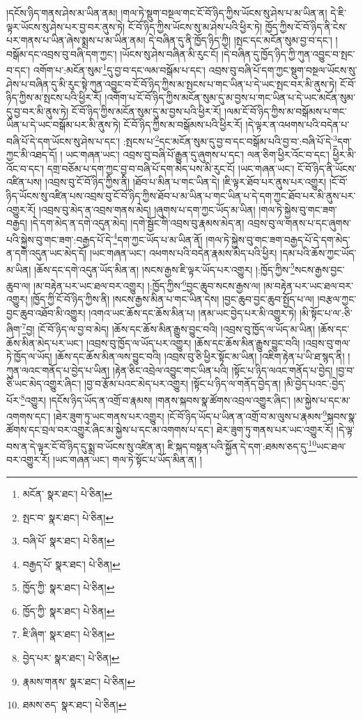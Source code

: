 །དངོས་ཉིད་གནས་ཤེས་མ་ཡིན་ནམ། །གལ་ཏེ་སྡུག་བསྔལ་གང་ངོ་བོ་ཉིད་ཀྱིས་ཡོངས་སུ་ཤེས་པ་མ་ཡིན་ན། དེ་ཇི་ལྟར་ཡོངས་སུ་ཤེས་པར་བྱ་བར་ནུས་ཏེ། ངོ་བོ་ཉིད་ཀྱིས་ཡོངས་སུ་མ་ཤེས་པའི་ཕྱིར་ཏེ། ཁྱོད་ཀྱིས་ངོ་བོ་ཉིད་ནི་ངེས་པར་གནས་པ་ཡིན་ཞེས་སྨྲས་པ་མ་ཡིན་ནམ། དེ་བཞིན་དུ་ནི་ཁྱོད་ཉིད་ཀྱི། །སྤང་དང་མངོན་སུམ་བྱ་བ་དང་། །བསྒོམ་དང་འབྲས་བུ་བཞི་དག་ཀྱང་། །ཡོངས་སུ་ཤེས་བཞིན་མི་རུང་ངོ། །དེ་བཞིན་དུ་ཁྱོད་ཉིད་ཀྱི་ཀུན་འབྱུང་བ་སྤང་བ་དང་། འགོག་པ་:མངོན་སུམ་\footnote{མངོན་  སྣར་ཐང་།  པེ་ཅིན། }དུ་བྱ་བ་དང་ལམ་བསྒོམ་པ་དང་། འབྲས་བུ་བཞི་པོ་དག་ཀྱང་སྡུག་བསྔལ་ཡོངས་སུ་ཤེས་པ་བཞིན་དུ་མི་རུང་སྟེ་ཀུན་འབྱུང་བ་ངོ་བོ་ཉིད་ཀྱིས་མ་སྤངས་པ་གང་ཡིན་པ་དེ་ཡང་སྤང་བར་མི་ནུས་ཏེ། ངོ་བོ་ཉིད་ཀྱིས་མ་སྤངས་པའི་ཕྱིར་རོ། །འགོག་པ་ངོ་བོ་ཉིད་ཀྱིས་མངོན་སུམ་དུ་མ་བྱས་པ་གང་ཡིན་པ་དེ་ཡང་མངོན་སུམ་དུ་བྱ་བར་མི་ནུས་ཏེ། ངོ་བོ་ཉིད་ཀྱིས་མངོན་སུམ་དུ་མ་བྱས་པའི་ཕྱིར་རོ། །ལམ་ངོ་བོ་ཉིད་ཀྱིས་མ་བསྒོམས་པ་གང་ཡིན་པ་དེ་ཡང་བསྒོམ་པར་མི་ནུས་ཏེ། ངོ་བོ་ཉིད་ཀྱིས་མ་བསྒོམས་པའི་ཕྱིར་རོ། །དེ་ལྟར་ན་འཕགས་པའི་བདེན་པ་བཞི་པོ་དེ་དག་ཡོངས་སུ་ཤེས་པ་དང་། :སྤངས་པ་\footnote{སྤང་བ་  སྣར་ཐང་།  པེ་ཅིན། }དང་མངོན་སུམ་དུ་བྱ་བ་དང་བསྒོམ་པའི་བྱ་བ་:བཞི་པོ་དེ་\footnote{བཞི་པོ་  སྣར་ཐང་།  པེ་ཅིན། }དག་ཀྱང་མི་འཐད་དོ། །
ཡང་གཞན་ཡང་། འབྲས་བུ་བཞི་པོ་རྒྱུན་དུ་ཞུགས་པ་དང་། ལན་ཅིག་ཕྱིར་འོང་བ་དང་། ཕྱིར་མི་འོང་བ་དང་། དགྲ་བཅོམ་པ་དག་ཀྱང་བྱ་བ་བཞི་པོ་དག་མེད་པས་མི་རུང་ངོ། །ཡང་གཞན་ཡང་། ངོ་བོ་ཉིད་ནི་ཡོངས་འཛིན་པས། །འབྲས་བུ་ངོ་བོ་ཉིད་ཀྱིས་ནི། །ཐོབ་པ་མིན་པ་གང་ཡིན་དེ། །ཇི་ལྟར་ཐོབ་པར་ནུས་པར་འགྱུར། །ངོ་བོ་ཉིད་ཡོངས་སུ་འཛིན་པས་འབྲས་བུ་ངོ་བོ་ཉིད་ཀྱིས་ཐོབ་པ་མ་ཡིན་པ་གང་ཡིན་པ་དེ་དག་ཀྱང་ཐོབ་པར་མི་ནུས་པར་འགྱུར་རོ། །འབྲས་བུ་མེད་ན་འབྲས་གནས་མེད། །ཞུགས་པ་དག་ཀྱང་ཡོད་མ་ཡིན། །གལ་ཏེ་སྐྱེས་བུ་གང་ཟག་བརྒྱད། །དེ་དག་མེད་ན་དགེ་འདུན་མེད། །དགེ་སྦྱོང་གི་འབྲས་བུ་རྣམས་མེད་ན། འབྲས་བུ་ལ་གནས་པ་དང་ཞུགས་པའི་སྐྱེས་བུ་གང་ཟག་:བརྒྱད་པོ་དེ་\footnote{བརྒྱད་པོ་  སྣར་ཐང་།  པེ་ཅིན། }དག་ཀྱང་ཡོད་པ་མ་ཡིན་ནོ། །གལ་ཏེ་སྐྱེས་བུ་གང་ཟག་བརྒྱད་པོ་དེ་དག་མེད་ན་དགེ་འདུན་ཡང་མེད་དོ། །ཡང་གཞན་ཡང་། འཕགས་པའི་བདེན་རྣམས་མེད་པའི་ཕྱིར། །དམ་པའི་ཆོས་ཀྱང་ཡོད་མ་ཡིན། །ཆོས་དང་དགེ་འདུན་ཡོད་མིན་ན། །སངས་རྒྱས་ཇི་ལྟར་ཡོད་པར་འགྱུར། །:ཁྱོད་ཀྱིས་\footnote{ཁྱོད་ཀྱི་  སྣར་ཐང་།  པེ་ཅིན། }སངས་རྒྱས་བྱང་ཆུབ་ལ། །མ་བརྟེན་པར་ཡང་ཐལ་བར་འགྱུར། །:ཁྱོད་ཀྱིས་\footnote{ཁྱོད་ཀྱི་  སྣར་ཐང་།  པེ་ཅིན། }བྱང་ཆུབ་སངས་རྒྱས་ལ། །མ་བརྟེན་པར་ཡང་ཐལ་བར་འགྱུར། །ཁྱོད་ཀྱི་ངོ་བོ་ཉིད་ཀྱིས་ནི། །སངས་རྒྱས་མིན་པ་གང་ཡིན་དེས། །བྱང་ཆུབ་བྱང་ཆུབ་སྤྱོད་པ་ལ། །བརྩལ་ཀྱང་བྱང་ཆུབ་འཐོབ་མི་འགྱུར། །འགའ་ཡང་ཆོས་དང་ཆོས་མིན་པ། །ནམ་ཡང་བྱེད་པར་མི་འགྱུར་ཏེ། །མི་སྟོང་པ་ལ་:ཅི་ཞིག་\footnote{ཇི་ཞིག་  སྣར་ཐང་།  པེ་ཅིན། }བྱ། །ངོ་བོ་ཉིད་ལ་བྱ་བ་མེད། །ཆོས་དང་ཆོས་མིན་རྒྱུས་བྱུང་བའི། །འབྲས་བུ་ཁྱོད་ལ་ཡོད་མ་ཡིན། །ཆོས་དང་ཆོས་མིན་མེད་པར་ཡང་། །འབྲས་བུ་ཁྱོད་ལ་ཡོད་པར་འགྱུར། །ཆོས་དང་ཆོས་མིན་རྒྱུས་བྱུང་བའི། །འབྲས་བུ་གལ་ཏེ་ཁྱོད་ལ་ཡོད། །ཆོས་དང་ཆོས་མིན་ལས་བྱུང་བའི། །འབྲས་བུ་ཅི་ཕྱིར་སྟོང་མ་ཡིན། །འཇིག་རྟེན་པ་ཡི་ཐ་སྙད་ནི། །ཀུན་ལའང་གནོད་པ་བྱེད་པ་ཡིན། །རྟེན་ཅིང་འབྲེལ་འབྱུང་གང་ཡིན་པའི། །སྟོང་པ་ཉིད་ལའང་གནོད་པ་བྱེད། །བྱ་བ་ཅི་ཡང་མེད་འགྱུར་ཞིང་། །བྱ་བ་རྩོམ་པའང་མེད་པར་འགྱུར། །སྟོང་པ་ཉིད་ལ་གནོད་བྱེད་ན། །མི་བྱེད་པའང་:བྱེད་པོར་\footnote{བྱེད་པར་  སྣར་ཐང་།  པེ་ཅིན། }འགྱུར། །དངོས་ཉིད་ཡོད་ན་འགྲོ་བ་རྣམས། །གནས་སྐབས་སྣ་ཚོགས་འབྲལ་འགྱུར་ཞིང་། །མ་སྐྱེས་པ་དང་མ་འགགས་དང་། །ཐེར་ཟུག་ཏུ་ཡང་གནས་པར་འགྱུར། །ངོ་བོ་ཉིད་ཡོད་པ་ཡིན་ན་འགྲོ་བ་མ་ལུས་པ་རྣམས་\footnote{རྣམས་གནས་  སྣར་ཐང་།  པེ་ཅིན། }སྐབས་སྣ་ཚོགས་དང་བྲལ་བར་འགྱུར་ཞིང་མ་སྐྱེས་པ་དང་མ་འགགས་པ་དང་། ཐེར་ཟུག་ཏུ་གནས་པར་ཡང་འགྱུར་རོ། །དེ་ལྟ་བས་ན་དེ་ལྟར་ངོ་བོ་ཉིད་དུ་སྨྲ་བ་ཡོངས་སུ་འཛིན་ན། ཇི་སྐད་བསྟན་པའི་སྐྱོན་དེ་དག་:ཐམས་ཅད་དུ་\footnote{ཐམས་ཅད་  སྣར་ཐང་།  པེ་ཅིན། }ཡང་ཐལ་བར་འགྱུར་རོ། །ཡང་གཞན་ཡང་། གལ་ཏེ་སྟོང་པ་ཡོད་མིན་ན། །
